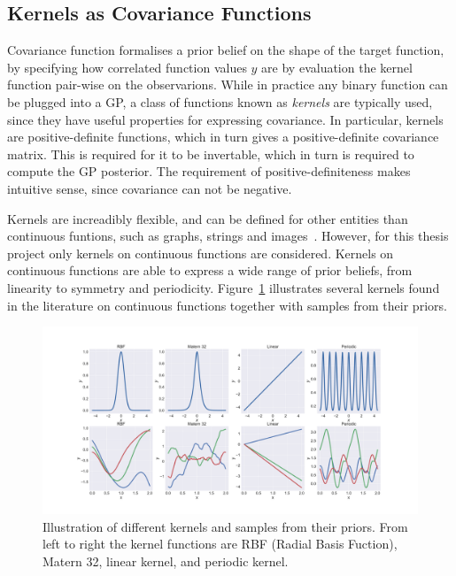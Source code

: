 \subsection{Kernels as Covariance Functions}\label{sec:kernels-as-priors}
Covariance function formalises a prior belief on the shape of the target
function, by specifying how correlated function values $y$ are by
evaluation the kernel function pair-wise on the observarions. 
While in practice any binary function can be plugged into
a GP, a class of functions known as \textit{kernels} are typically
used, since they have useful properties for expressing covariance. In
particular, kernels are positive-definite functions, which in turn
gives a positive-definite covariance matrix. This is required for it
to be invertable, which in turn is required to compute the GP posterior. 
The requirement of positive-definiteness makes intuitive sense, since covariance can not
be negative. 

Kernels are increadibly flexible, and can be defined for other entities than continuous
funtions, such as graphs, strings and
images~\cite{duvenaud2013structure}. However, for this thesis project
only kernels on continuous functions are considered. Kernels on
continuous functions are able to express a wide range of prior beliefs, from linearity to symmetry and
periodicity. Figure~\ref{fig:kernel-priors} illustrates several kernels
found in the literature on continuous functions together with samples from their priors.
\begin{figure}
  \centering
  \includegraphics[width=\textwidth]{figures/kernel-priors-vert}
  \caption{Illustration of different kernels and samples from their
    priors. From left to right the kernel functions are RBF (Radial
    Basis Fuction), Matern 32, linear kernel, and periodic kernel.}\label{fig:kernel-priors}
\end{figure}

